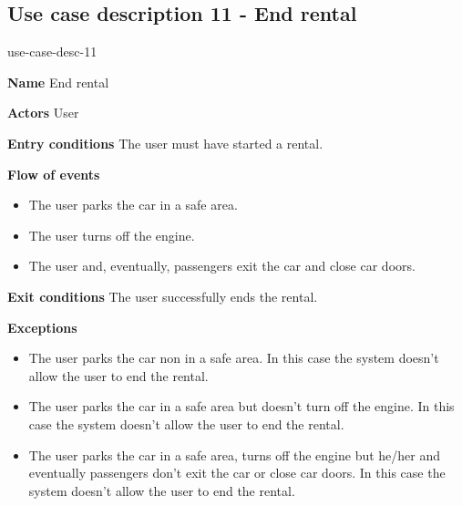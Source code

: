\subsection{Use case description 11 - End rental}
\begin{labeling}{use-case-desc-11}
		\item[\textbf{Name}] End rental
		\item[\textbf{Actors}] User
		\item[\textbf{Entry conditions}] The user must have started a rental.
		\item[\textbf{Flow of events}]
			\begin{itemize}
				\item[]
				\item The user parks the car in a safe area.
				\item The user turns off the engine.
				\item The user and, eventually, passengers exit the car and close car doors.
			\end{itemize}
		\item[\textbf{Exit conditions}] The user successfully ends the rental.
		\item[\textbf{Exceptions}]
			\begin{itemize}
				\item[]
				\item The user parks the car non in a safe area. In this case the system doesn't allow the user to end the rental.
				\item The user parks the car in a safe area but doesn't turn off the engine. In this case the system doesn't allow the user to end the rental.
				\item The user parks the car in a safe area, turns off the engine but he/her and eventually passengers don't exit the car or close car doors. In this case the system doesn't allow the user to end the rental.  
			\end{itemize}
	\end{labeling}